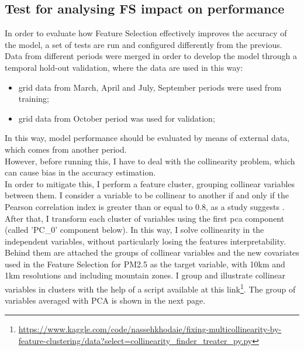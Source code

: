 \subsection{Test for analysing FS impact on performance}
In order to evaluate how Feature Selection effectively improves the accuracy of the model, a set of tests are run and configured differently from the previous.\\ 
Data from different periods were merged in order to develop the model through a temporal hold-out validation, where the data are used in this way:
\begin{itemize}
    \item grid data from March, April and July, September periods were used from training;
    \item grid data from October period was used for validation;
\end{itemize}
In this way, model performance should be evaluated by means of external data, which comes from another period.\\
However, before running this, I have to deal with the collinearity problem, which can cause bias in the accuracy estimation.\\ In order to mitigate this, I perform a feature cluster, grouping collinear variables between them. I consider a variable to be collinear to another if and only if the Pearson correlation index is greater than or equal to 0.8, as a study suggests \cite{shrestha2020detecting}. \\
After that, I transform each cluster of variables using the first \gls{pca} component (called 'PC\_0' component below). In this way, I solve collinearity in the independent variables, without particularly losing the features interpretability.\\
Behind them are attached the groups of collinear variables and the new covariates used in the Feature Selection for PM2.5 as the target variable, with 10km and 1km resolutions and including mountain zones.
I group and illustrate collinear variables in clusters with the help of a script available at this link\footnote{\url{https://www.kaggle.com/code/nassehkhodaie/fixing-multicollinearity-by-feature-clustering/data?select=collinearity_finder_treater_py.py}}.
The group of variables averaged with PCA is shown in the next page.

\pagebreak
